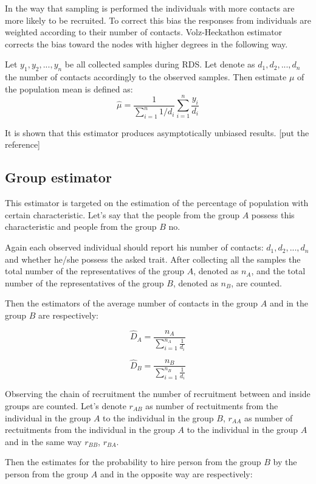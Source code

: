 \documentclass[12pt]{report}
\begin{document}
In the way that sampling is performed the individuals with more contacts are more likely to be recruited. To correct this bias the responses from individuals are weighted according to their number of contacts. Volz-Heckathon estimator corrects the bias toward the nodes with higher degrees in the following way.

Let $y_1, y_2, ..., y_n$ be all collected samples during RDS. Let denote as $d_1, d_2, ..., d_n$ the number of contacts accordingly to the observed samples.
Then estimate $\mu$ of the population mean is defined as:
$$ \hat{\mu} = \frac{1}{\sum\limits_{i=1}^n 1/d_i} \sum\limits_{i=1}^n \frac{y_i}{d_i}$$

It is shown that this estimator produces asymptotically unbiased results. [put the reference]

\subsection{Group estimator}

This estimator is targeted on the estimation of the percentage of population with certain characteristic. Let's say that the people from the group $A$ possess this characteristic and people from the group $B$ no. 

Again each observed individual should report his number of contacts: $d_1, d_2, ..., d_n$ and whether he/she possess the asked trait. After collecting all the samples the total number of the representatives of the group $A$, denoted as $n_A$, and the total number of the representatives of the group $B$, denoted as $n_B$, are counted. 

Then the estimators of the average number of contacts in the group $A$ and in the group $B$ are respectively:

$$ \widehat{D}_A = \frac{n_A}{ \sum_{i=1}^{n_A} \frac{1}{d_i}} $$

$$ \widehat{D}_B = \frac{n_B}{ \sum_{i=1}^{n_B} \frac{1}{d_i}} $$

Observing the chain of recruitment the number of recruitment between and inside groups are counted. Let's denote $r_{AB}$ as number of rectuitments from the individual in the group $A$ to the individual in the group $B$, $r_{AA}$ as number of rectuitments from the individual in the group $A$ to the individual in the group $A$ and in the same way $r_{BB}$, $r_{BA}$.

Then the estimates for the probability to hire person from the group $B$ by the person from the group $A$ and in the opposite way are respectively:
\end{document}
